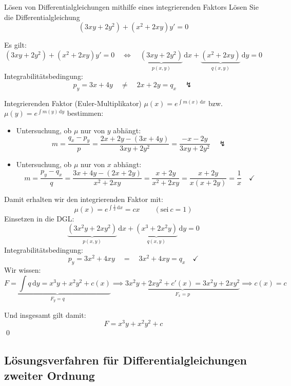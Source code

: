 \documentclass[german]{../spicker}
\renewcommand{\d}{\,\mathrm{d}}
\begin{document}
\begin{example}{Lösen von Differentialgleichungen mithilfe eines integrierenden Faktors}
    Lösen Sie die Differentialgleichung
    $$
        (3xy + 2y^2) + (x^2 + 2xy) y' = 0
    $$

    \noindent\makebox[\linewidth]{\rule{\textwidth}{1pt}}

    Es gilt:
    $$
        (3xy + 2y^2) + (x^2 + 2xy) y' = 0 \quad \iff \quad \underbrace{(3xy + 2y^2)}_{p(x, y)}\d x + \underbrace{(x^2 + 2xy)}_{q(x, y)}\d y = 0
    $$
    Integrabilitätsbedingung:
    $$
        p_y = 3x + 4y \quad \neq \quad 2x + 2y = q_x \quad \lightning
    $$

    Integrierenden Faktor (Euler-Multiplikator) $\mu(x) = e^{\int m(x) \d x}$ bzw. $\mu(y) = e^{\int m(y) \d y}$ bestimmen:
    \begin{itemize}
        \item Untersuchung, ob $\mu$ nur von $y$ abhängt:
              $$
                  m = \frac{q_x - p_y}{p} = \frac{2x + 2y - \left(3x + 4y\right)}{3xy + 2y^2} = \frac{-x - 2y}{3xy + 2y^2} \quad \lightning
              $$
        \item Untersuchung, ob $\mu$ nur von $x$ abhängt:
              $$
                  m = \frac{p_y - q_x}{q} = \frac{3x + 4y - (2x + 2y)}{x^2 + 2xy} = \frac{x + 2y}{x^2 + 2xy} = \frac{x+2y}{x(x+2y)} = \frac{1}{x} \quad \checkmark
              $$
    \end{itemize}

    Damit erhalten wir den integrierenden Faktor mit:
    $$
        \mu(x) = e^{\int \frac{1}{x} \d x} = cx \qquad (\text{sei} \ c = 1)
    $$
    Einsetzen in die DGL:
    $$
        \underbrace{\left(3x^2y + 2xy^2\right)}_{p(x, y)}\d x + \underbrace{\left(x^3 + 2x^2y\right)}_{q(x, y)}\d y = 0
    $$
    Integrabilitätsbedingung:
    $$
        p_y = 3x^2 + 4xy \quad = \quad 3x^2 + 4xy = q_x \quad \checkmark
    $$
    Wir wissen:
    $$
        \underbrace{F = \int q \d y = x^3y + x^2y^2 + c(x)}_{F_y = q} \implies \underbrace{3x^2y + 2xy^2 + c'(x) = 3x^2y + 2xy^2}_{F_x = p}  \implies  c(x) = c
    $$

    Und insgesamt gilt damit:
    $$
        F = x^3y + x^2y^2 + c
    $$\qed
\end{example}

\subsection{Lösungsverfahren für Differentialgleichungen zweiter Ordnung}
\end{document}
